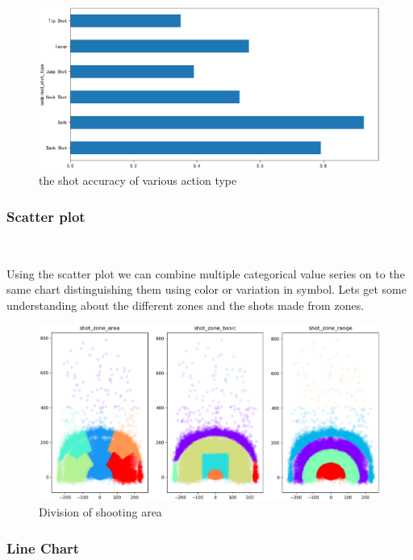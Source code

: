 \begin{figure}[htbp]
	\centering
	\includegraphics[scale=0.4]{f.eps
	}        %
	\caption{the shot accuracy of various action type}
	\label{fig6}
\end{figure}

\subsubsection{Scatter plot}
\
 
Using the scatter plot we can combine multiple 
categorical value series on to the same chart distinguishing them using color or 
variation in symbol.
Lets get some understanding about the different zones and the shots made from zones.

\begin{figure}[htbp]
	\centering
	\includegraphics[scale=0.3]{h.eps
	}        %
	\caption{Division of shooting area}
	\label{fig8}
\end{figure}

\subsubsection{Line Chart}
\

